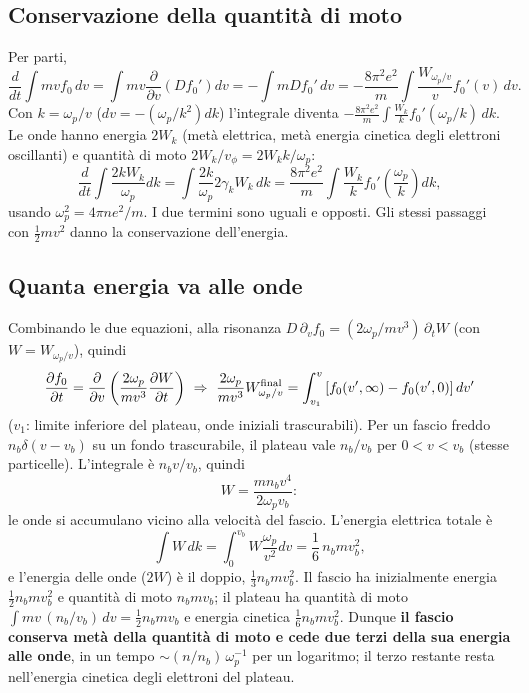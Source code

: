 \subsection{Conservazione della quantità di moto}
Per parti,
\begin{equation}
\frac{d}{dt}\int mvf_0\,dv=\int mv\frac{\partial}{\partial v}\left(Df_0'\right)dv=-\int mDf_0'\,dv=-\frac{8\pi^2e^2}{m}\int\frac{W_{\omega_p/v}}{v}f_0'(v)\,dv .
\end{equation}
Con $k=\omega_p/v$ ($dv=-(\omega_p/k^2)dk$) l'integrale diventa $-\frac{8\pi^2e^2}{m}\int\frac{W_k}{k}f_0'(\omega_p/k)\,dk$. Le onde hanno energia $2W_k$ (metà elettrica, metà energia cinetica degli elettroni oscillanti) e quantità di moto $2W_k/v_\phi=2W_kk/\omega_p$:
\begin{equation}
\frac{d}{dt}\int\frac{2kW_k}{\omega_p}dk=\int\frac{2k}{\omega_p}2\gamma_kW_k\,dk=\frac{8\pi^2e^2}{m}\int\frac{W_k}{k}f_0'\left(\frac{\omega_p}{k}\right)dk,
\end{equation}
usando $\omega_p^2=4\pi ne^2/m$. I due termini sono uguali e opposti. Gli stessi passaggi con $\frac12mv^2$ danno la conservazione dell'energia.

\subsection{Quanta energia va alle onde}
Combinando le due equazioni, alla risonanza $D\,\partial_vf_0=(2\omega_p/mv^3)\,\partial_tW$ (con $W=W_{\omega_p/v}$), quindi
\begin{equation}
\frac{\partial f_0}{\partial t}=\frac{\partial}{\partial v}\left(\frac{2\omega_p}{mv^3}\frac{\partial W}{\partial t}\right)\ \Rightarrow\ \frac{2\omega_p}{mv^3}W^{\rm final}_{\omega_p/v}=\int_{v_1}^v\left[f_0(v',\infty)-f_0(v',0)\right]dv'
\end{equation}
($v_1$: limite inferiore del plateau, onde iniziali trascurabili). Per un fascio freddo $n_b\delta(v-v_b)$ su un fondo trascurabile, il plateau vale $n_b/v_b$ per $0<v<v_b$ (stesse particelle). L'integrale è $n_bv/v_b$, quindi
\begin{equation}
W=\frac{mn_bv^4}{2\omega_pv_b}:
\end{equation}
le onde si accumulano vicino alla velocità del fascio. L'energia elettrica totale è
\begin{equation}
\int W\,dk=\int_0^{v_b}W\frac{\omega_p}{v^2}dv=\frac16\,n_bmv_b^2,
\end{equation}
e l'energia delle onde ($2W$) è il doppio, $\frac13n_bmv_b^2$. Il fascio ha inizialmente energia $\frac12n_bmv_b^2$ e quantità di moto $n_bmv_b$; il plateau ha quantità di moto $\int mv\,(n_b/v_b)\,dv=\frac12n_bmv_b$ e energia cinetica $\frac16n_bmv_b^2$. Dunque \textbf{il fascio conserva metà della quantità di moto e cede due terzi della sua energia alle onde}, in un tempo $\sim(n/n_b)\,\omega_p^{-1}$ per un logaritmo; il terzo restante resta nell'energia cinetica degli elettroni del plateau.

